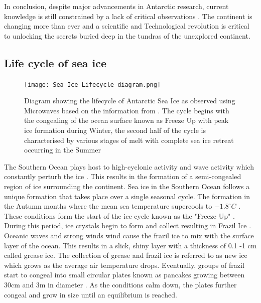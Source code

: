 In conclusion, despite major advancements in Antarctic research, current knowledge is still constrained by a lack of critical observations \cite{kennicutt2019sustained}. The continent is changing more than ever and a scientific and Technological revolution is critical to unlocking the secrets buried deep in the tundras of the unexplored continent. 

\subsection{Life cycle of sea ice}
\label{chapter2:subseclcs}
\begin{figure}[H]
    \centering
    \texttt{[image: Sea Ice Lifecycle diagram.png]}
    \caption{Diagram showing the lifecycle of Antarctic Sea Ice as observed using Microwaves based on the information from \textcite{barber2005microwave}. The cycle begins with the congealing of the ocean surface known as Freeze Up with peak ice formation during Winter, the second half of the cycle is characterised by various stages of melt with complete sea ice retreat occurring in the Summer}
    \label{fig:ice_diag}
\end{figure}

The Southern Ocean plays host to high-cyclonic activity and wave activity which constantly perturb the ice \cite{vichi2019effects}. This results in the formation of a semi-congealed region of ice surrounding the continent. Sea ice in the Southern Ocean follows a unique formation that takes place over a single seasonal cycle. The formation in the Autumn months where the mean sea temperature supercools to $-1.8^{\circ}C$ \cite{womack_2020}. These conditions form the start of the ice cycle known as the "Freeze Up" \cite{barber2005microwave}. During this period, ice crystals begin to form and collect resulting in Frazil Ice \cite{barber2005microwave}. Oceanic waves and strong winds wind cause the frazil ice to mix with the surface layer of the ocean. This results in a slick, shiny layer with a thickness of 0.1 -1 cm called grease ice. The collection of grease and frazil ice is referred to as new ice  \cite{womack_2020} which grows as the average air temperature drops. Eventually, groups of frazil start to congeal into small circular plates known as pancakes \cite{womack_2020} growing between 30cm and 3m in diameter \cite{icedefinition1992}. As the conditions calm down, the plates further congeal and grow in size until an equilibrium is reached\cite{barber2005microwave}. \par 

